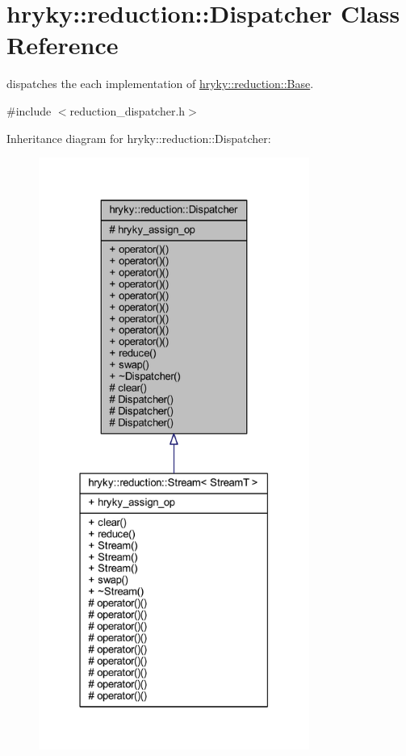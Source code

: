 \hypertarget{classhryky_1_1reduction_1_1_dispatcher}{\section{hryky\-:\-:reduction\-:\-:Dispatcher Class Reference}
\label{classhryky_1_1reduction_1_1_dispatcher}
}


dispatches the each implementation of \hyperlink{classhryky_1_1reduction_1_1_base}{hryky\-::reduction\-::\-Base}.  




{\ttfamily \#include $<$reduction\-\_\-dispatcher.\-h$>$}



Inheritance diagram for hryky\-:\-:reduction\-:\-:Dispatcher\-:
\nopagebreak
\begin{figure}[H]
\begin{center}
\leavevmode
\includegraphics[height=550pt]{classhryky_1_1reduction_1_1_dispatcher__inherit__graph}
\end{center}
\end{figure}
